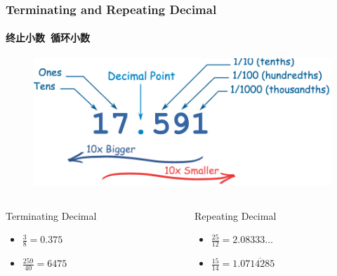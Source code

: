 \documentclass[
	11pt, %
	handout,
]{beamer}
\begin{document}

\begin{frame}
\frametitle{Terminating and  Repeating Decimal}
\framesubtitle{终止小数\ 循环小数}

		\begin{figure}
		\includegraphics[width=0.5\linewidth]{Decimal.png}
	  \end{figure}

	  \begin{columns}[t] %
			\begin{column}{0.45\textwidth} %
						\begin{exampleblock}{Terminating Decimal}
								\begin{itemize}
									\item $\frac{3}{8} = 0.375$
									\item $\frac{259}{40} = 6475$
								\end{itemize}							
						\end{exampleblock}
			\end{column}

			\begin{column}{0.5\textwidth} %
			\begin{exampleblock}{Repeating Decimal}
								\begin{itemize}
									\item $\frac{25}{12} = 2.08333 \ldots$
									\item $\frac{15}{14} = 1.0\overline{714285}$
								\end{itemize}	
			\end{exampleblock}
			\end{column}
	\end{columns}
\end{frame}

\end{document}
